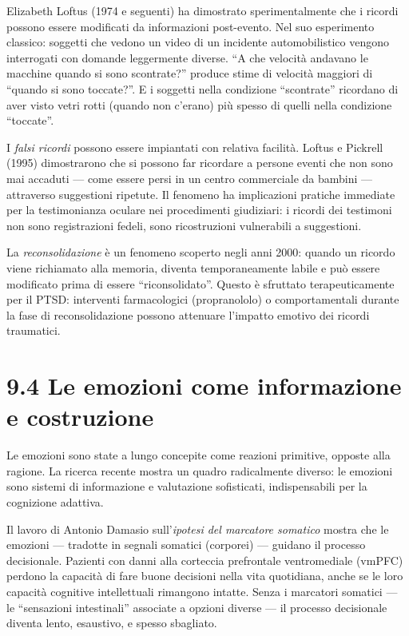 \documentclass[11.5pt,a4paper,openany]{book}
\theoremstyle{remark}
\begin{document}
Elizabeth Loftus (1974 e seguenti) ha dimostrato sperimentalmente che i ricordi possono essere modificati da informazioni post-evento. Nel suo esperimento classico: soggetti che vedono un video di un incidente automobilistico vengono interrogati con domande leggermente diverse. ``A che velocità andavano le macchine quando si sono scontrate?'' produce stime di velocità maggiori di ``quando si sono toccate?''. E i soggetti nella condizione ``scontrate'' ricordano di aver visto vetri rotti (quando non c'erano) più spesso di quelli nella condizione ``toccate''.

I \textit{falsi ricordi} possono essere impiantati con relativa facilità. Loftus e Pickrell (1995) dimostrarono che si possono far ricordare a persone eventi che non sono mai accaduti --- come essere persi in un centro commerciale da bambini --- attraverso suggestioni ripetute. Il fenomeno ha implicazioni pratiche immediate per la testimonianza oculare nei procedimenti giudiziari: i ricordi dei testimoni non sono registrazioni fedeli, sono ricostruzioni vulnerabili a suggestioni.

La \textit{reconsolidazione} è un fenomeno scoperto negli anni 2000: quando un ricordo viene richiamato alla memoria, diventa temporaneamente labile e può essere modificato prima di essere ``riconsolidato''. Questo è sfruttato terapeuticamente per il PTSD: interventi farmacologici (propranololo) o comportamentali durante la fase di reconsolidazione possono attenuare l'impatto emotivo dei ricordi traumatici.

\section{9.4 Le emozioni come informazione e costruzione}

Le emozioni sono state a lungo concepite come reazioni primitive, opposte alla ragione. La ricerca recente mostra un quadro radicalmente diverso: le emozioni sono sistemi di informazione e valutazione sofisticati, indispensabili per la cognizione adattiva.

Il lavoro di Antonio Damasio sull'\textit{ipotesi del marcatore somatico} mostra che le emozioni --- tradotte in segnali somatici (corporei) --- guidano il processo decisionale. Pazienti con danni alla corteccia prefrontale ventromediale (vmPFC) perdono la capacità di fare buone decisioni nella vita quotidiana, anche se le loro capacità cognitive intellettuali rimangono intatte. Senza i marcatori somatici --- le ``sensazioni intestinali'' associate a opzioni diverse --- il processo decisionale diventa lento, esaustivo, e spesso sbagliato.
\end{document}
